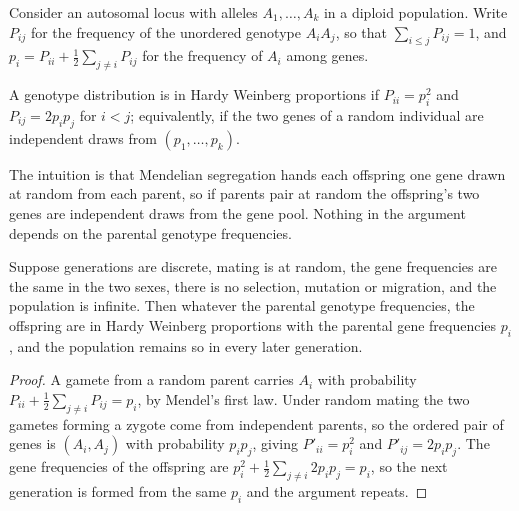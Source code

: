 Consider an autosomal locus with alleles $A_1,\dots,A_k$ in a diploid population. Write
$P_{ij}$ for the frequency of the unordered genotype $A_iA_j$, so that $\sum_{i\le j}P_{ij}=1$,
and $p_i=P_{ii}+\tfrac12\sum_{j\ne i}P_{ij}$ for the frequency of $A_i$ among genes.

\begin{definition}\label{toolkit:def:hw}
A genotype distribution is in Hardy Weinberg proportions if $P_{ii}=p_i^2$ and
$P_{ij}=2p_ip_j$ for $i<j$; equivalently, if the two genes of a random individual are
independent draws from $(p_1,\dots,p_k)$.
\end{definition}

The intuition is that Mendelian segregation hands each offspring one gene drawn at random from
each parent, so if parents pair at random the offspring's two genes are independent draws from
the gene pool. Nothing in the argument depends on the parental genotype frequencies.

\begin{theorem}\label{toolkit:thm:hw}
Suppose generations are discrete, mating is at random, the gene frequencies are the same in the
two sexes, there is no selection, mutation or migration, and the population is infinite.
Then whatever the parental genotype frequencies, the offspring are in Hardy Weinberg proportions
with the parental gene frequencies $p_i$, and the population remains so in every later
generation.
\end{theorem}

\begin{proof}
A gamete from a random parent carries $A_i$ with probability $P_{ii}+\tfrac12\sum_{j\ne
i}P_{ij}=p_i$, by Mendel's first law. Under random mating the two gametes forming a zygote come
from independent parents, so the ordered pair of genes is $(A_i,A_j)$ with probability
$p_ip_j$, giving $P'_{ii}=p_i^2$ and $P'_{ij}=2p_ip_j$. The gene frequencies of the offspring
are $p_i^2+\tfrac12\sum_{j\ne i}2p_ip_j=p_i$, so the next generation is formed from the same
$p_i$ and the argument repeats.
\end{proof}

